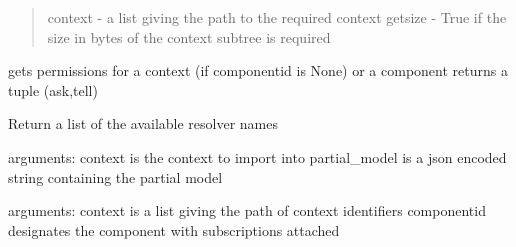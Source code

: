 \documentclass[letterpaper,10pt,english]{sphinxmanual}
\begin{document}
\begin{fulllineitems}
\begin{fulllineitems}
\begin{quote}
context - a list giving the path to the required context
getsize - True if the size in bytes of the context subtree is required
\end{quote}

\end{fulllineitems}


\begin{fulllineitems}
\label{personis.client:personis.client.Access.getpermission}
gets permissions for a context (if componentid is None) or
a component
returns a tuple (ask,tell)

\end{fulllineitems}


\begin{fulllineitems}
\label{personis.client:personis.client.Access.getresolvers}
Return a list of the available resolver names

\end{fulllineitems}


\begin{fulllineitems}
\label{personis.client:personis.client.Access.import_model}
arguments:
context is the context to import into
partial\_model is a json encoded string containing the partial model

\end{fulllineitems}


\begin{fulllineitems}
\label{personis.client:personis.client.Access.list_subs}
arguments:
context is a list giving the path of context identifiers
componentid designates the component with subscriptions attached

\end{fulllineitems}



\end{fulllineitems}
\end{document}
